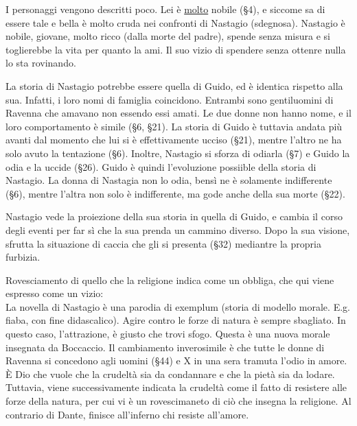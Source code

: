 \documentclass[a4paper]{article}
\begin{document}

I personaggi vengono descritti poco. Lei è \underline{molto} nobile (§4), e siccome sa di essere tale e bella
è molto cruda nei confronti di Nastagio (sdegnosa). Nastagio è nobile, giovane, molto ricco (dalla morte del padre),
spende senza misura e si toglierebbe la vita per quanto la ami. Il suo vizio di spendere senza ottenre nulla lo sta rovinando.

La storia di Nastagio potrebbe essere quella di Guido, ed è identica rispetto alla sua.
Infatti, i loro nomi di famiglia coincidono. Entrambi sono gentiluomini di Ravenna
che amavano non essendo essi amati.
Le due donne non hanno nome, e il loro comportamento è simile (§6, §21).
La storia di Guido è tuttavia andata più avanti dal momento che lui si è effettivamente ucciso (§21), 
mentre l'altro ne ha solo avuto la tentazione (§6).
Inoltre, Nastagio si sforza di odiarla (§7) e Guido la odia e la uccide (§26).
Guido è quindi l'evoluzione possiible della storia di Nastagio.
La donna di Nastagia non lo odia, bensì ne è solamente indifferente (§6), mentre l'altra
non solo è indifferente, ma gode anche della sua morte (§22).

Nastagio vede la proiezione della sua storia in quella di Guido, e cambia il corso degli eventi per far sì che
la sua prenda un cammino diverso.
Dopo la sua visione, sfrutta la situazione di caccia che gli si presenta (§32) mediantre la propria furbizia.

Rovesciamento di quello che la religione indica come un obbliga, che qui viene espresso come un vizio: \\
La novella di Nastagio è una parodia di exemplum (storia di modello morale. E.g. fiaba, con fine didascalico).
Agire contro le forze di natura è sempre sbagliato. In questo caso, l'attrazione, è giusto che trovi sfogo.
Questa è una nuova morale insegnata da Boccaccio.
Il cambiamento inverosimile è che tutte le donne di Ravenna si concedono agli uomini (§44)
e X in una sera tramuta l'odio in amore.
È Dio che vuole che la crudeltà sia da condannare e che la pietà sia da lodare.
Tuttavia, viene successivamente indicata la crudeltà come il fatto di resistere alle forze della natura, per cui
vi è un rovescimaneto di ciò che insegna la religione.
Al contrario di Dante, finisce all'inferno chi resiste all'amore.


\end{document}
